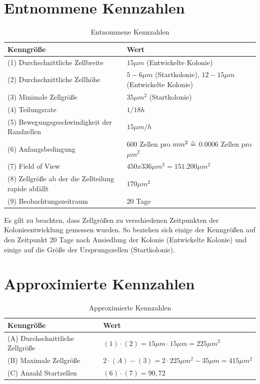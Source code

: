 \documentclass[11pt,a4paper,pointlessnumbers]{scrreprt}  %
\begin{document}
\section{Entnommene Kennzahlen}\label{sec: Entnommene Kennzahlen}
\begin{table}[!ht]
	\centering
	\caption{Entnommene Kennzahlen}
	\label{my-label}
	\begin{tabularx}{\textwidth}{lX}
		\toprule
		\textbf{Kenngröße} & \textbf{Wert}                                                                                          \\ \midrule
		(1) Durchschnittliche Zellbreite &	$15 \mu m$ (Entwickelte Kolonie) 
		\\
		(2) Durchschnittliche Zellhöhe & $5-6 \mu m$ (Startkolonie), $12-15 \mu m$ (Entwickelte Kolonie) 
		\\
		(3) Minimale Zellgröße & $35 \mu m ^{2}$ (Startkolonie) 
		\\
		(4) Teilungsrate & $1/18h$ 
		\\
		(5) Bewegungsgeschwindigkeit der Randzellen & $15 \mu m/h$ 
		\\
		(6) Anfangsbedingung    & 600 Zellen pro $mm^{2} \text{\space} \widehat{=} $ 0.0006 Zellen pro $\mu m^{2}$ 
		\\
		(7) Field of View & $450x336 \mu m^{2} = 151.200 \mu m^{2}$ 
		\\
		(8) Zellgröße ab der die Zellteilung rapide abfällt & $170 \mu m^{2} $
		\\
		(9) Beobachtungszeitraum & 20 Tage 
		\\ \bottomrule
	\end{tabularx}
\end{table}

Es gilt zu beachten, dass Zellgrößen zu verschiedenen Zeitpunkten der Kolonieentwicklung gemessen wurden. So beziehen sich einige der Kenngrößen auf den Zeitpunkt 20 Tage nach Ansiedlung der Kolonie (Entwickelte Kolonie) und einige auf die Größe der Ursprungszellen (Startkolonie).

\newpage
\section{Approximierte Kennzahlen}\label{sec: Approximierte Kennzahlen}
\begin{table}[!ht]
	\centering
	\caption{Approximierte Kennzahlen}
	\label{my-label}
	\begin{tabularx}{\textwidth}{lX}
		\toprule
		\textbf{Kenngröße} & \textbf{Wert}                                                                                          \\ \midrule
		(A) Durchschnittliche Zellgröße &	$(1) \cdot (2) = 15\mu m \cdot 15\mu m = 225 \mu m^{2}$ 
		\\
		(B) Maximale Zellgröße &  $2 \cdot (A) - (3) = 2 \cdot 225 \mu m^{2}-35\mu m = 415 \mu m^{2}$
		\\
		(C) Anzahl Startzellen & $(6) \cdot (7) = 90,72$
		\\ \bottomrule
	\end{tabularx}
\end{table}
\end{document}
